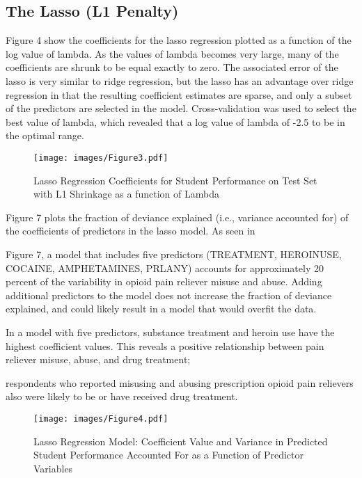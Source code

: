 \documentclass[sigconf]{acmart}
\begin{document}

\subsection{The Lasso (L1 Penalty)}

Figure 4 show the coefficients for the lasso regression plotted as a function 
of the log value of lambda. As the values of lambda becomes very large, many of 
the  coefficients are shrunk to be equal exactly to zero. The associated error 
of the lasso is very similar to ridge regression, but the lasso has an 
advantage over ridge regression in that the resulting coefficient estimates 
are sparse, and only a subset of the predictors are selected in the model. 
Cross-validation was used to select the best value of lambda, which 
revealed that a log value of lambda of -2.5 to be in the optimal range.


\begin{figure}[!ht]
  \centering\texttt{[image: images/Figure3.pdf]}
  \caption{Lasso Regression Coefficients for Student Performance on Test Set 
  with L1 Shrinkage as a function of Lambda}
  \label{f:Figure3}
\end{figure}

Figure 7 plots the fraction of deviance explained (i.e., variance accounted 
for) of the coefficients of predictors in the lasso model. As seen in 

Figure 7, a model that includes five predictors (TREATMENT, HEROINUSE, 
COCAINE, AMPHETAMINES, PRLANY) accounts for approximately 20 percent of the 
variability in opioid pain reliever misuse and abuse. Adding additional 
predictors to the model does not increase the fraction of deviance explained, 
and could likely result in a model that would overfit the data. 

In a model with five predictors, substance treatment and heroin use have the 
highest coefficient values. This reveals a positive relationship between pain 
reliever misuse, abuse, and drug treatment; 

respondents who reported misusing and abusing prescription opioid pain relievers
also were likely to be or have received drug treatment. 



\begin{figure}[!ht]
  \centering\texttt{[image: images/Figure4.pdf]}
  \caption{Lasso Regression Model: Coefficient Value and Variance in Predicted 
  Student Performance Accounted For as a Function of Predictor Variables }
  \label{f:Figure4}
\end{figure}
\end{document}

